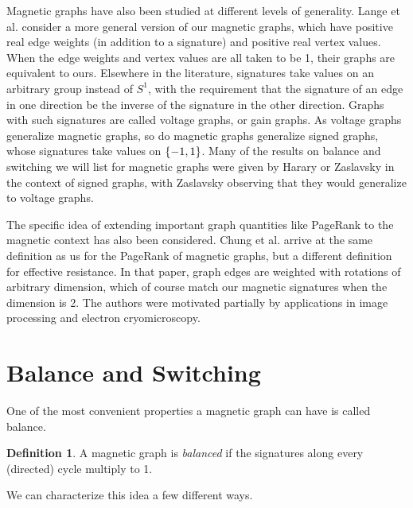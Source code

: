 \documentclass{article}
\theoremstyle{definition}
\newtheorem{defn}[thm]{Definition}
\DeclarePairedDelimiter\set{\{}{\}}
\begin{document}
Magnetic graphs have also been studied at different levels of generality. Lange et al. \cite{lange} consider a more general version of our magnetic graphs, which have positive real edge weights (in addition to a signature) and positive real vertex values. When the edge weights and vertex values are all taken to be 1, their graphs are equivalent to ours. Elsewhere in the literature, signatures take values on an arbitrary group instead of $S^1$, with the requirement that the signature of an edge in one direction be the inverse of the signature in the other direction. Graphs with such signatures are called voltage graphs, or gain graphs. As voltage graphs generalize magnetic graphs, so do magnetic graphs generalize signed graphs, whose signatures take values on $\set*{-1, 1}$. Many of the results on balance and switching we will list for magnetic graphs were given by Harary \cite{harary} or Zaslavsky \cite{zaslavsky} in the context of signed graphs, with Zaslavsky observing that they would generalize to voltage graphs.

The specific idea of extending important graph quantities like PageRank to the magnetic context has also been considered. Chung et al. \cite{sparsifyingconnectiongraph} arrive at the same definition as us for the PageRank of magnetic graphs, but a different definition for effective resistance. In that paper, graph edges are weighted with rotations of arbitrary dimension, which of course match our magnetic signatures when the dimension is 2. The authors were motivated partially by applications in image processing and electron cryomicroscopy. 

\section{Balance and Switching}

One of the most convenient properties a magnetic graph can have is called balance.

\begin{defn}
    A magnetic graph is \textit{balanced} if the signatures along every (directed) cycle multiply to 1.
\end{defn}

We can characterize this idea a few different ways.
\end{document}
